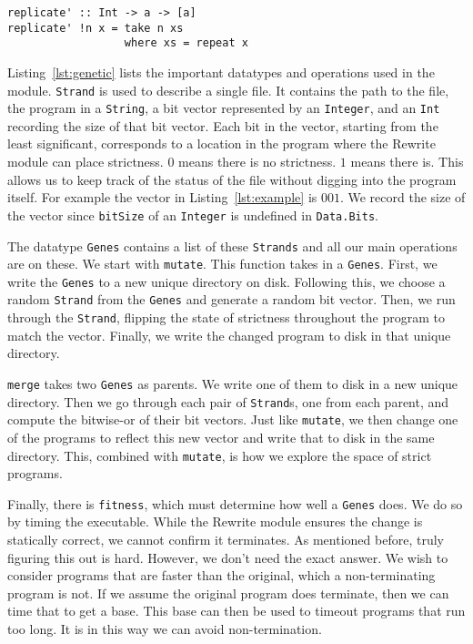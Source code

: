\documentclass{sigplanconf}
\begin{document}
\begin{lstlisting}[caption=Example program,label={lst:example}]
replicate' :: Int -> a -> [a]
replicate' !n x = take n xs
                  where xs = repeat x
\end{lstlisting}


Listing~\ref{lst:genetic} lists the important datatypes and operations used in the module. \lstinline!Strand! is used to describe a single file. It contains the path to the file, the program in a \lstinline!String!, a bit vector represented by an \lstinline!Integer!, and an \lstinline!Int! recording the size of that bit vector. Each bit in the vector, starting from the least significant, corresponds to a location in the program where the Rewrite module can place strictness. $0$ means there is no strictness. $1$ means there is. This allows us to keep track of the status of the file without digging into the program itself. For example the vector in Listing~\ref{lst:example} is $001$. We record the size of the vector since \lstinline!bitSize! of an \lstinline!Integer! is undefined in \lstinline!Data.Bits!.

The datatype \lstinline!Genes! contains a list of these \lstinline!Strands! and all our main operations are on these. We start with \lstinline!mutate!. This function takes in a \lstinline!Genes!. First, we write the \lstinline!Genes! to a new unique directory on disk. Following this, we choose a random \lstinline!Strand! from the \lstinline!Genes! and generate a random bit vector. Then, we run through the \lstinline!Strand!, flipping the state of strictness throughout the program to match the vector. Finally, we write the changed program to disk in that unique directory.

\lstinline!merge! takes two \lstinline!Genes! as parents. We write one of them to disk in a new unique directory. Then we go through each pair of \lstinline!Strand!s, one from each parent, and compute the bitwise-or of their bit vectors. Just like \lstinline!mutate!, we then change one of the programs to reflect this new vector and write that to disk in the same directory. This, combined with \lstinline!mutate!, is how we explore the space of strict programs.

Finally, there is \lstinline!fitness!, which must determine how well a \lstinline!Genes! does. We do so by timing the executable. While the Rewrite module ensures the change is statically correct, we cannot confirm it terminates. As mentioned before, truly figuring this out is hard. However, we don't need the exact answer. We wish to consider programs that are faster than the original, which a non-terminating program is not. If we assume the original program does terminate, then we can time that to get a base. This base can then be used to timeout programs that run too long. It is in this way we can avoid non-termination.
\end{document}
